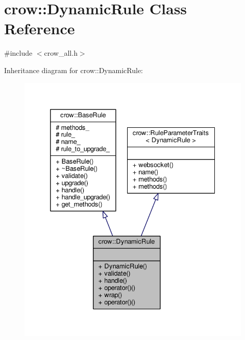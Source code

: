 \hypertarget{classcrow_1_1_dynamic_rule}{\section{crow\-:\-:Dynamic\-Rule Class Reference}
\label{classcrow_1_1_dynamic_rule}
}


{\ttfamily \#include $<$crow\-\_\-all.\-h$>$}



Inheritance diagram for crow\-:\-:Dynamic\-Rule\-:
\nopagebreak
\begin{figure}[H]
\begin{center}
\leavevmode
\includegraphics[width=332pt]{classcrow_1_1_dynamic_rule__inherit__graph}
\end{center}
\end{figure}


